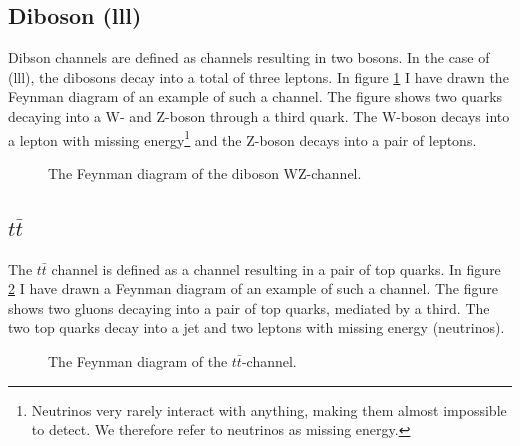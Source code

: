 \subsection{Diboson (lll)}
Dibson channels are defined as channels resulting in two bosons. In the case of (lll), the dibosons
decay into a total of three leptons. In figure \ref{fig:wz} I have drawn the Feynman diagram of an 
example of such a channel. The figure shows two quarks decaying into a W- and Z-boson through a 
third quark. The W-boson decays into a lepton with missing energy\footnote{Neutrinos very rarely interact
with anything, making them almost impossible to detect. We therefore refer to neutrinos as missing energy.}
and the Z-boson decays into a pair of leptons. 
\begin{figure}
    \centering
    \caption{The Feynman diagram of the diboson WZ-channel.}
    \label{fig:wz}
\end{figure}
\subsection{$t\bar{t}$}
The $t\bar{t}$ channel is defined as a channel resulting in a pair of top quarks. In figure
\ref{fig:ttbar} I have drawn a Feynman diagram of an example of such a channel. The figure 
shows two gluons decaying into a pair of top quarks, mediated by a third. The two top quarks 
decay into a jet and two leptons with missing energy (neutrinos). 
\begin{figure}
    \centering
    \caption{The Feynman diagram of the $t\bar{t}$-channel.}
    \label{fig:ttbar}
\end{figure}

